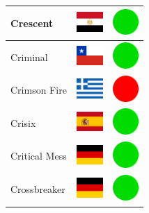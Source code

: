 \documentclass[12pt, a4paper, twoside]{report}
\begin{document}
\begin{center}
\begin{longtable}{|p{5cm}|p{2cm}|p{2cm}|}
 Crescent                                                   & \includegraphics[width=1cm]{../img/flags/eg} &   \includegraphics[width=1cm]{../likes/y} \\ \hline
 Criminal                                                   & \includegraphics[width=1cm]{../img/flags/cl} &   \includegraphics[width=1cm]{../likes/y} \\ \hline
 Crimson Fire                                               & \includegraphics[width=1cm]{../img/flags/gr} &   \includegraphics[width=1cm]{../likes/n} \\ \hline
 Crisix                                                     & \includegraphics[width=1cm]{../img/flags/es} &   \includegraphics[width=1cm]{../likes/y} \\ \hline
 Critical Mess                                              & \includegraphics[width=1cm]{../img/flags/de} &   \includegraphics[width=1cm]{../likes/y} \\ \hline
 Crossbreaker                                               & \includegraphics[width=1cm]{../img/flags/de} &   \includegraphics[width=1cm]{../likes/y} \\ \hline

\end{longtable}
\end{center}
\end{document}
